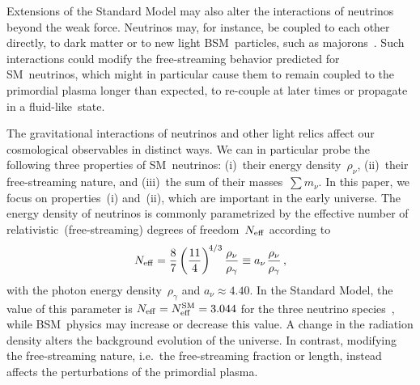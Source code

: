 Extensions of the Standard Model may also alter the interactions of neutrinos beyond the weak force. Neutrinos may, for instance, be coupled to each other directly, to dark matter or to new light BSM~particles, such as majorons~\cite{Berryman:2022hds}. Such interactions could modify the free-streaming behavior predicted for SM~neutrinos, which might in particular cause them to remain coupled to the primordial plasma longer than expected, to re-couple at later times or propagate in a fluid-like~state.\medskip

The gravitational interactions of neutrinos and other light relics affect our cosmological observables in distinct ways. We can in particular probe the following three properties of SM~neutrinos: (i)~their energy density~$\rho_\nu$, (ii)~their free-streaming nature, and (iii)~the sum of their masses~$\sum m_\nu$. In this paper, we focus on properties~(i) and~(ii), which are important in the early universe. The energy density of neutrinos is commonly parametrized by the effective number of relativistic~(free-streaming) degrees of freedom~$N_\mathrm{eff}$ according to
\begin{equation}
	N_\mathrm{eff} = \frac{8}{7} \left(\frac{11}{4}\right)^{\!4/3} \frac{\rho_\nu}{\rho_\gamma} \equiv a_\nu\hskip1pt\frac{\rho_\nu}{\rho_\gamma}\, ,	\label{ch12-eq:Neff}
\end{equation}
with the photon energy density~$\rho_\gamma$ and $a_\nu \approx 4.40$. In the Standard Model, the value of this parameter is $N_\mathrm{eff} = N_\mathrm{eff}^\mathrm{SM} = 3.044$ for the three neutrino species~\cite{Akita:2020szl, Froustey:2020mcq, Bennett:2020zkv, Cielo:2023bqp, Drewes:2024wbw, Drewes:2024nbg}, while BSM~physics may increase or decrease this value. A change in the radiation density alters the background evolution of the universe. In contrast, modifying the free-streaming nature, i.e.\ the free-streaming fraction or length, instead affects the perturbations of the primordial plasma.

